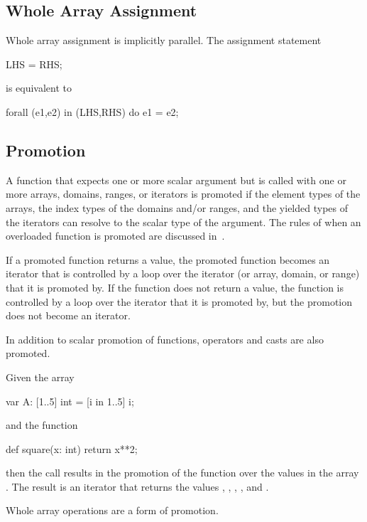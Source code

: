 \subsection{Whole Array Assignment}

Whole array assignment is implicitly parallel.  The assignment
statement
\begin{chapel}
LHS = RHS;
\end{chapel}
is equivalent to
\begin{chapel}
forall (e1,e2) in (LHS,RHS) do
  e1 = e2;
\end{chapel}

\subsection{Promotion}
\label{Promotion}

A function that expects one or more scalar argument but is called with
one or more arrays, domains, ranges, or iterators is promoted if the
element types of the arrays, the index types of the domains and/or
ranges, and the yielded types of the iterators can resolve to the
scalar type of the argument.  The rules of when an overloaded function
is promoted are discussed in~.

If a promoted function returns a value, the promoted function becomes
an iterator that is controlled by a loop over the iterator (or array,
domain, or range) that it is promoted by.  If the function does not
return a value, the function is controlled by a loop over the iterator
that it is promoted by, but the promotion does not become an iterator.

In addition to scalar promotion of functions, operators and casts are
also promoted.

\begin{example}
Given the array
\begin{chapel}
var A: [1..5] int = [i in 1..5] i;
\end{chapel}
and the function
\begin{chapel}
def square(x: int) return x**2;
\end{chapel}
then the call  results in the promotion of
the  function over the values in the array .  The
result is an iterator that returns the
values , , , , and .
\end{example}

Whole array operations are a form of promotion.

